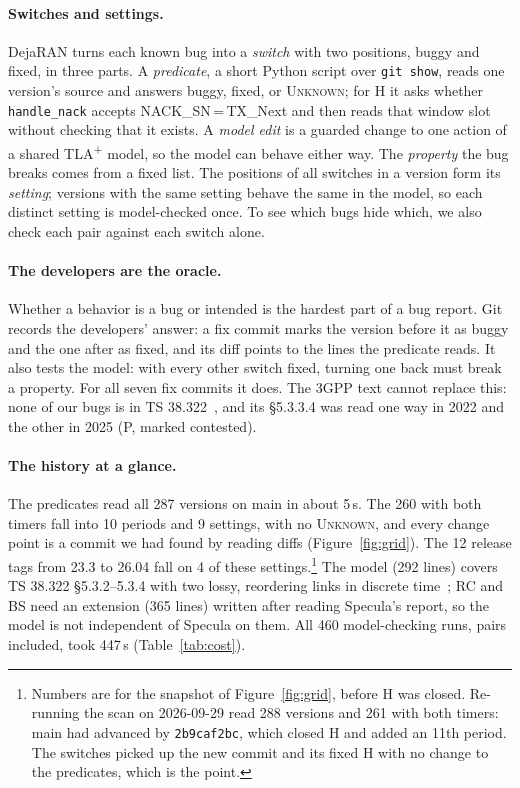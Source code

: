 \documentclass[sigconf,10pt]{acmart}
\newcommand{\sw}[1]{\textsf{\small #1}}
\newcommand{\commit}[1]{\texttt{\small #1}}
\begin{document}
\paragraph{Switches and settings.}
DejaRAN turns each known bug into a \emph{switch} with two positions,
buggy and fixed, in three parts. A \emph{predicate}, a short Python
script over \texttt{git show}, reads one version's source and answers
buggy, fixed, or \textsc{Unknown}; for \sw{H} it asks whether
\texttt{handle\_nack} accepts NACK\_SN\,=\,TX\_Next and then reads that
window slot without checking that it exists. A \emph{model edit} is a
guarded change to one action of a shared TLA\textsuperscript{+} model, so
the model can behave either way. The \emph{property} the bug breaks comes
from a fixed list. The positions of all switches in a version form its
\emph{setting}; versions with the same setting behave the same in the
model, so each distinct setting is model-checked once. To see which bugs
hide which, we also check each pair against each switch alone.

\paragraph{The developers are the oracle.}
Whether a behavior is a bug or intended is the hardest part of a bug
report. Git records the developers' answer: a fix commit marks the
version before it as buggy and the one after as fixed, and its diff
points to the lines the predicate reads. It also tests the model: with
every other switch fixed, turning one back must break a property. For all
seven fix commits it does. The 3GPP text cannot replace this: none of our
bugs is in TS 38.322~\cite{ts38322}, and its \S5.3.3.4 was read one way in
2022 and the other in 2025 (\sw{P}, marked contested).

\paragraph{The history at a glance.}
The predicates read all 287 versions on main in about 5\,s. The 260 with
both timers fall into 10 periods and 9 settings, with no \textsc{Unknown},
and every change point is a commit we had found by reading diffs
(Figure~\ref{fig:grid}). The 12 release tags from 23.3 to 26.04 fall on
4 of these settings.\footnote{Numbers are for the snapshot of
Figure~\ref{fig:grid}, before \sw{H} was closed. Re-running the scan on
2026-09-29 read 288 versions and 261 with both timers: main had advanced
by \commit{2b9caf2bc}, which closed \sw{H} and added an 11th period. The
switches picked up the new commit and its fixed \sw{H} with no change to
the predicates, which is the point.} The model (292 lines) covers TS 38.322
\S5.3.2--5.3.4 with two lossy, reordering links in discrete
time~\cite{henzinger1992digital}; \sw{RC} and \sw{BS} need an extension
(365 lines) written after reading Specula's report, so the model is not
independent of Specula on them. All 460 model-checking runs, pairs
included, took 447\,s (Table~\ref{tab:cost}).
\end{document}
